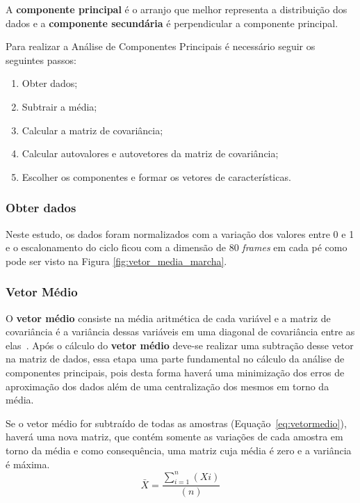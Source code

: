 A \textbf{componente principal} é o arranjo que melhor representa a distribuição dos dados e a \textbf{componente secundária} é perpendicular a componente principal.

Para realizar a Análise de Componentes Principais é necessário seguir os seguintes passos:
\begin{enumerate}
	\item Obter dados;
	\item Subtrair a média;
	\item Calcular a matriz de covariância;
	\item Calcular autovalores e autovetores da matriz de covariância;
	\item Escolher os componentes e formar os vetores de características.
\end{enumerate}


\subsubsection{Obter dados}
Neste estudo, os dados foram normalizados com a variação dos valores entre 0 e 1 e o escalonamento do ciclo ficou com a dimensão de 80 \textit{frames} em cada pé como pode ser visto na Figura \ref{fig:vetor_media_marcha}. 

\subsubsection{Vetor Médio}\label{sec:vetor_medio}
O \textbf{vetor médio} consiste na média aritmética de cada variável e a matriz de covariância é a variância dessas variáveis em uma diagonal de covariância entre as elas~\cite{statisticshandbook2009}. Após o cálculo do \textbf{vetor médio} deve-se realizar uma subtração desse vetor na matriz de dados, essa etapa uma parte fundamental no cálculo da análise de componentes principais, pois desta forma haverá uma minimização dos erros de aproximação dos dados além de uma centralização dos mesmos em torno da média.

Se o vetor médio for subtraído de todas as amostras (Equação~\ref{eq:vetormedio}), haverá uma nova matriz, que contém somente as variações de cada amostra em torno da média e como consequência, uma matriz cuja média é zero e a variância é máxima.
\newline
\begin{equation}
\bar{X}=\frac{\sum_{i=1}^{n}(Xi)}{(n)}
\label{eq:vetormedio}
\end{equation}

